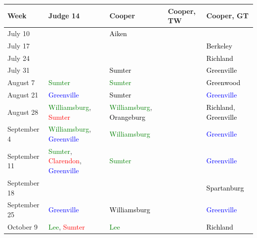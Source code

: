 \documentclass[11pt, oneside]{article}   	%
\newcommand{\rowgroup}[1]{\hspace{-1em}#1}
\theoremstyle{ModifiedStyle}
\begin{document}
    \begin{table}[H]
    	\centering
    	\vspace{-11mm}
    	\hspace*{-16mm}
    	\setlength\tabcolsep{0pt} %
    	{\footnotesize
    		\begin{tabular}{L{23mm}C{55mm}C{38mm}C{38mm}C{38mm}}
    			\hline
    			\rule{0pt}{2.3ex} Week & Judge 14 & Cooper & Cooper, TW & Cooper, GT \\
    			\hline
    			\rule{0pt}{2.3ex} July 10 & & \textcolor{black}{Aiken} & &\\
    			\rule{0pt}{2.3ex} July 17 & & & &  \textcolor{black}{Berkeley}\\\rule{0pt}{2.3ex} July 24 & & & &  \textcolor{black}{Richland}\\
    			\rule{0pt}{2.3ex} July 31 & & \textcolor{black}{Sumter} & &  \textcolor{black}{Greenville}\\\rule{0pt}{2.3ex} August 7 &  \textcolor{green}{Sumter} & \textcolor{green}{Sumter} & &  \textcolor{black}{Greenwood}\\
    			\rule{0pt}{2.3ex} August 21 &  \textcolor{blue}{Greenville} & \textcolor{black}{Sumter} & &  \textcolor{blue}{Greenville}\\
    			\rule{0pt}{2.3ex} August 28 &  \textcolor{green}{Williamsburg}, \textcolor{red}{Sumter} & \textcolor{green}{Williamsburg}, \textcolor{black}{Orangeburg} & &  \textcolor{black}{Richland}, \textcolor{black}{Greenville}\\
    			\rule{0pt}{2.3ex} September 4 &  \textcolor{green}{Williamsburg}, \textcolor{blue}{Greenville} & \textcolor{green}{Williamsburg} & &  \textcolor{blue}{Greenville}\\
    			\rule{0pt}{2.3ex} September 11 &  \textcolor{green}{Sumter}, \textcolor{red}{Clarendon}, \textcolor{blue}{Greenville} & \textcolor{green}{Sumter} & &  \textcolor{blue}{Greenville}\\
    			\rule{0pt}{2.3ex} September 18 & & & &  \textcolor{black}{Spartanburg}\\
    			\rule{0pt}{2.3ex} September 25 &  \textcolor{blue}{Greenville} & \textcolor{black}{Williamsburg} & &  \textcolor{blue}{Greenville}\\
    			\rule{0pt}{2.3ex} October 9 &  \textcolor{green}{Lee}, \textcolor{red}{Sumter} & \textcolor{green}{Lee} & &  \textcolor{black}{Richland}\\

\end{tabular}}
\end{table}
\end{document}

